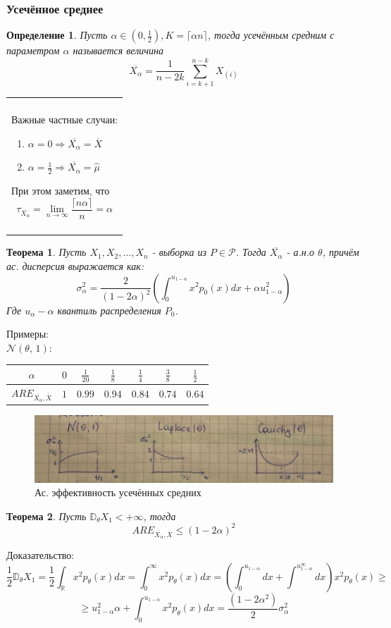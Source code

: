 \documentclass[a4paper,12pt]{article}
\newcommand{\disp}{\mathbb{D}}
\newcommand{\orst}[2]{#1_{(#2)}}
\newcommand{\normal}[2]{\mathcal{N}(#1,\,#2)}
\newcommand{\sample}{X_1, X_2, ..., X_n}
\newcommand{\R}{\mathbb{R}}
\newenvironment{annotation}{\begin{center}
    \begin{tabular}{|p{0.9\textwidth}|}
    \hline\\
}
{ 
    \\\\\hline
    \end{tabular} 
    \end{center}
}
\newtheorem{dfn}{Определение}[section]
\theoremstyle{named}
\newtheorem*{namedtheorem}{Теорема}
\begin{document}
\subsubsection{Усечённое среднее}
\begin{dfn}
    Пусть $\alpha \in (0, \frac12), K = \lceil \alpha n \rceil$, тогда усечённым средним с параметром $\alpha$ называется величина
    $$
        \overline{X_\alpha} = \frac{1}{n-2k}\sum_{i=k+1}^{n-k}\orst{X}{i}
    $$
\end{dfn}
\begin{annotation}
    Важные частные случаи:
    \begin{enumerate}
        \item $\alpha = 0 \Rightarrow \overline{X_\alpha} = \overline{X}$
        \item $\alpha = \frac12 \Rightarrow \overline{X_\alpha} = \hat\mu$
    \end{enumerate}
    При этом заметим, что 
    $$
        \tau_{\overline{X_\alpha}} = \lim_{n\to\infty}\frac{\lceil n \alpha \rceil}{n} = \alpha 
    $$
\end{annotation}
\begin{namedtheorem}
    Пусть $\sample$ - выборка из $P \in \mathcal{P}$. Тогда $\overline{X_\alpha}$ - а.н.о $\theta$, причём ас. дисперсия выражается как:
    $$
        \sigma_\alpha^2 = \frac{2}{(1-2\alpha)^2}\left(\int_0^{u_{1-\alpha}} x^2p_0(x) dx + \alpha u_{1-\alpha}^2\right)
    $$
    Где $u_\alpha - \alpha$ квантиль распределения $P_0$.
\end{namedtheorem}
Примеры:\\
$\normal{\theta}{1}$:
\begin{center}
    \begin{tabular}{ |c|c|c|c|c|c|c| } 
     \hline
     $\alpha$ & $0$ & $\frac{1}{20}$ & $\frac{1}{8}$ & $\frac{1}{4}$ & $\frac{3}{8}$ & $\frac{1}{2}$ \\
     \hline
     $ARE_{\overline{X_\alpha}, \overline{X}}$ & $1$ & $0.99$ & $0.94$ & $0.84$ & $0.74$ & $0.64$ \\
     \hline
    \end{tabular}
\end{center}
\begin{figure}
    \includegraphics[width=\linewidth]{graphs_are.png}
    \caption{Ас. эффективность усечённых средних}
\end{figure}
\begin{namedtheorem}
    Пусть $\disp_\theta X_1 < + \infty$, тогда
    $$
        ARE_{\overline{X_\alpha}, \overline{X}} \leq (1-2\alpha)^2 
    $$
\end{namedtheorem}
Доказательство:
$$
    \frac{1}{2}\disp_\theta X_1 = \frac{1}{2}\int_\R x^2p_\theta(x) dx  = \int_{0}^{\infty} x^2p_\theta(x)dx = 
    \left(\int_{0}^{u_{1-\alpha}} dx + \int^{u_{1-\alpha}^\infty} dx\right)x^2p_\theta(x) \geq 
    $$
    $$
    \geq u_{1-\alpha}^2\alpha
    + \int_{0}^{u_{1-\alpha}}x^2p_\theta(x) dx = \frac{(1-2\alpha^2)}{2}\sigma_\alpha^2
$$
\end{document}
